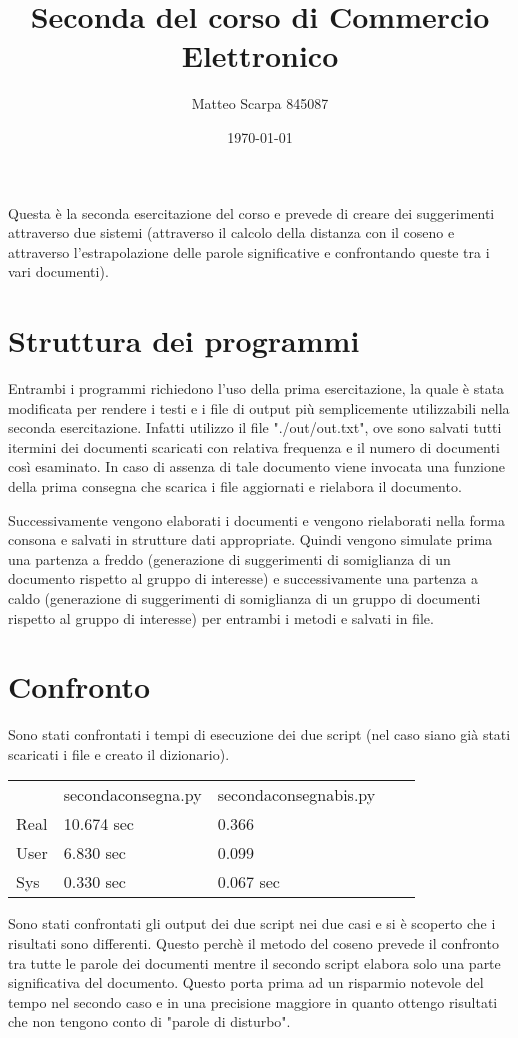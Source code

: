\documentclass[a4paper]{article}
\title{Seconda del corso di Commercio Elettronico}
\author{Matteo Scarpa 845087}
\date{\today}
\begin{document}
	\maketitle
	
	Questa è la seconda esercitazione del corso e prevede di creare dei suggerimenti attraverso due sistemi (attraverso il calcolo della distanza con il coseno e attraverso l'estrapolazione delle parole significative e confrontando queste tra i vari documenti). 
	
	\section*{Struttura dei programmi}
	Entrambi i programmi richiedono l'uso della prima esercitazione, la quale è stata modificata per rendere i testi e i file di output più semplicemente utilizzabili nella seconda esercitazione. Infatti utilizzo il file "./out/out.txt", ove sono salvati tutti itermini dei documenti scaricati con relativa frequenza e il numero di documenti così esaminato. In caso di assenza di tale documento viene invocata una funzione della prima consegna che scarica i file aggiornati e rielabora il documento.
	
	Successivamente  vengono elaborati i documenti e vengono rielaborati nella forma consona e salvati in strutture dati appropriate.  Quindi vengono simulate prima una partenza a freddo (generazione di suggerimenti di somiglianza di un documento rispetto al gruppo di interesse) e successivamente una partenza a caldo (generazione di suggerimenti di somiglianza di un gruppo di documenti rispetto al gruppo di interesse) per entrambi i metodi e salvati in file.
	
	\section*{Confronto}
	Sono stati confrontati i tempi di esecuzione dei due script (nel caso siano già stati scaricati i file e creato il dizionario).
\begin{table}[h]
\begin{tabular}{|l|l|l|ll}
\cline{1-3}
 & secondaconsegna.py & secondaconsegnabis.py &  &  \\ \cline{1-3}
Real & 10.674 sec & 0.366 &  &  \\ \cline{1-3}
User & 6.830 sec & 0.099 &  &  \\ \cline{1-3}
Sys & 0.330 sec & 0.067 sec &  &  \\ \cline{1-3}
\end{tabular}
\end{table}

Sono stati confrontati gli output dei due script nei due casi e si è scoperto che i risultati sono differenti. Questo perchè il metodo del coseno prevede il confronto tra tutte le parole dei documenti mentre il secondo script elabora solo una parte significativa del documento. 
Questo porta prima ad un risparmio notevole del tempo nel secondo caso e in una precisione maggiore in quanto ottengo risultati che non tengono conto di "parole di disturbo".
\end{document}
